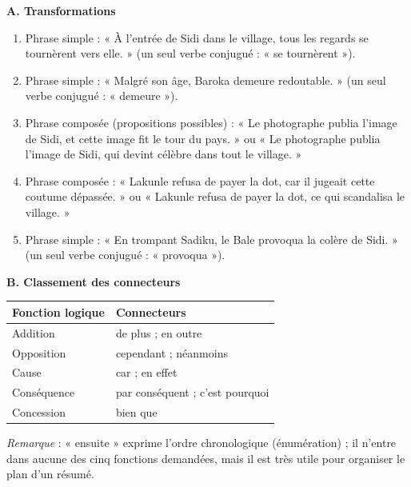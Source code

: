 \documentclass[11pt]{article}
\begin{document}
\begin{corrige}
\textbf{A. Transformations}
\begin{enumerate}
\item Phrase simple : « À l'entrée de Sidi dans le village, tous les regards se tournèrent vers elle. » (un seul verbe conjugué : « se tournèrent »).
\item Phrase simple : « Malgré son âge, Baroka demeure redoutable. » (un seul verbe conjugué : « demeure »).
\item Phrase composée (propositions possibles) : « Le photographe publia l'image de Sidi, et cette image fit le tour du pays. » ou « Le photographe publia l'image de Sidi, qui devint célèbre dans tout le village. »
\item Phrase composée : « Lakunle refusa de payer la dot, car il jugeait cette coutume dépassée. » ou « Lakunle refusa de payer la dot, ce qui scandalisa le village. »
\item Phrase simple : « En trompant Sadiku, le Bale provoqua la colère de Sidi. » (un seul verbe conjugué : « provoqua »).
\end{enumerate}
\textbf{B. Classement des connecteurs}
\begin{center}
\begin{tabularx}{\linewidth}{|l|X|}\hline
\rowcolor{popblueL} \textbf{Fonction logique} & \textbf{Connecteurs} \\ \hline
Addition & de plus ; en outre \\ \hline
Opposition & cependant ; néanmoins \\ \hline
Cause & car ; en effet \\ \hline
Conséquence & par conséquent ; c'est pourquoi \\ \hline
Concession & bien que \\ \hline
\end{tabularx}
\end{center}
\emph{Remarque} : « ensuite » exprime l'ordre chronologique (énumération) ; il n'entre dans aucune des cinq fonctions demandées, mais il est très utile pour organiser le plan d'un résumé.
\end{corrige}
\end{document}
